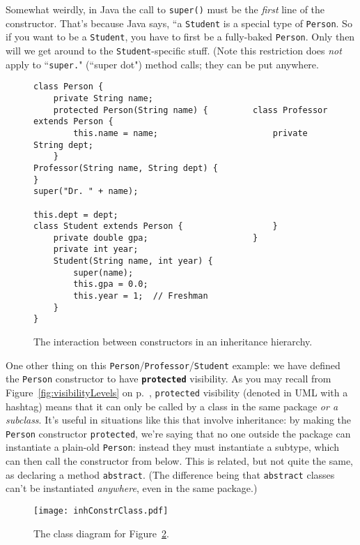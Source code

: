 Somewhat weirdly, in Java the call to \texttt{super()} must be the
\textit{first} line of the constructor. That's because Java says, ``a
\texttt{Student} is a special type of \texttt{Person}. So if you want to be a
\texttt{Student}, you have to first be a fully-baked \texttt{Person}. Only
then will we get around to the \texttt{Student}-specific stuff. (Note this
restriction does \textit{not} apply to ``\texttt{super.}" (``super dot")
method calls; they can be put anywhere.

\begin{figure}[ht]
\begin{Verbatim}[fontsize=\scriptsize,samepage=true,frame=single]
class Person {                    
    private String name;          
    protected Person(String name) {         class Professor extends Person {
        this.name = name;                       private String dept;
    }                                           Professor(String name, String dept) {
}                                                   super("Dr. " + name);
                                                    this.dept = dept;
class Student extends Person {                  }
    private double gpa;                     }
    private int year;
    Student(String name, int year) {
        super(name);
        this.gpa = 0.0;
        this.year = 1;  // Freshman
    }
}
\end{Verbatim}
\caption{The interaction between constructors in an inheritance hierarchy.}
\label{fig:inhConstrClass}
\end{figure}

One other thing on this \texttt{Person}/\texttt{Professor}/\texttt{Student}
example: we have defined the \texttt{Person} constructor to have
\textbf{\texttt{protected}} visibility. As you may recall from
Figure~\ref{fig:visibilityLevels} on p.~\pageref{fig:visibilityLevels},
\texttt{protected} visibility (denoted in UML with a hashtag) means that it
can only be called by a class in the same package \textit{or a subclass}. It's
useful in situations like this that involve inheritance: by making the
\texttt{Person} constructor \texttt{protected}, we're saying that no one
outside the package can instantiate a plain-old \texttt{Person}: instead they
must instantiate a subtype, which can then call the constructor from below.
This is related, but not quite the same, as declaring a method
\texttt{abstract}. (The difference being that \texttt{abstract} classes can't
be instantiated \textit{anywhere}, even in the same package.)

\begin{figure}
\centering
\texttt{[image: inhConstrClass.pdf]}
\caption{The class diagram for Figure~\ref{fig:inhConstrCode}.}
\label{fig:inhConstrCode}
\end{figure}


